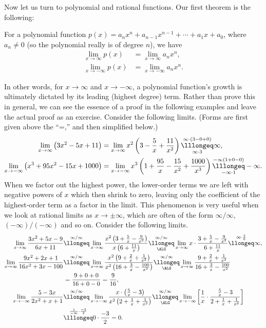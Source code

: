 Now let us turn to polynomial and rational functions.
Our first theorem is the following:
\begin{theorem}For a polynomial function
$p(x)=a_nx^n+a_{n-1}x^{n-1}+\cdots+a_1x+a_0$,
where $a_n\ne0$ (so the polynomial really is of
degree $n$), we have
\begin{align}
\lim_{x\to\infty}p(x)&=\lim_{x\to\infty}a_nx^n,\\
\lim_{x\to-\infty}p(x)&=\lim_{x\to-\infty}a_nx^n.
\end{align}\label{TheoremOnPolynomialGrowth}
\end{theorem}
In other words, for $x\to\infty$ and $x\to-\infty$,
a polynomial function's growth is ultimately
dictated by its leading (highest degree) term.  Rather than prove this
in general, we can see the essence of a proof
in the following examples and leave the actual proof
as an exercise.
\bex Consider the following limits. (Forms are first given above
the ``=,'' and then simplified below.)
\begin{align*}
\lim_{x\to\infty}\left(3x^2-5x+11\right)
&=\lim_{x\to\infty}x^2\left(3-\frac5x+\frac{11}{x^2}\right)
\overset{\infty\cdot(3-0+0)}{\underset{\infty\cdot3}{\lllongeq}}\infty,\\
\lim_{x\to-\infty}\left(x^3+95x^2-15x+1000\right)
&=\lim_{x\to-\infty}x^3\left(1+\frac{95}{x}-\frac{15}{x^2}
     +\frac{1000}{x^3}\right)
\overset{-\infty(1+0-0)}{\underset{-\infty\cdot1}{\lllongeq}}-\infty.
\end{align*}
\label{ExForHwLimitsXToInfinity}\eex
When we factor out the highest power, the lower-order
terms we are left with negative powers of $x$ which
then shrink to zero, leaving only the coefficient
of the highest-order term as a factor in the limit.
This phenomenon is very useful when we look at rational limits
as $x\to\pm\infty$, which are often of the form
$\infty/\infty$, $(-\infty)/(-\infty)$ and so on.
\bex Consider the following limits.
\begin{align*}
\lim_{x\to\infty}\frac{3x^2+5x-9}{6x+11}
  &\overset{\infty/\infty}{\llongeq}
  \lim_{x\to\infty}\frac{x^2\left(3+\frac5x-\frac9{x^2}\right)}
  {x\left(6+\frac{11}x\right)}
  \underset{\ALG}{\overset{\infty/\infty}{\llongeq}}\lim_{x\to\infty}
  x\cdot\frac{3+\frac5x-\frac9{x^2}}{6+\frac{11}{x}}
  \overset{\infty\cdot\frac36}{\llongeq}\infty,\\
\lim_{x\to\infty}\frac{9x^2+2x+1}{16x^2+3x-100}
  &\overset{\infty/\infty}{\llongeq}
  \lim_{x\to\infty}\frac{x^2\left(9+\frac2x+\frac1{x^2}\right)}
  {x^2\left(16+\frac3x-\frac{100}{x^2}\right)}
  \underset{\ALG}{\overset{\infty/\infty}{\llongeq}}\lim_{x\to\infty}
  \frac{9+\frac2x+\frac1{x^2}}{16+\frac3x-\frac{100}{x^2}}
  \\&=\frac{9+0+0}{16+0-0}=\frac9{16},\\
\lim_{x\to-\infty}\frac{5-3x}{2x^2+x+1}
  &\overset{\infty/\infty}{\llongeq}
  \lim_{x\to-\infty}\frac{x\cdot\left(\frac5x-3\right)}
  {x^2\left(2+\frac1x+\frac1{x^2}\right)}
  \underset{\ALG}{\overset{\infty/\infty}{\llongeq}}
  \lim_{x\to-\infty}\left[
    \frac1x\cdot\frac{\frac5x-3}{2+\frac1x+\frac1{x^2}}\right]\\
  &\overset{\frac1{-\infty}\cdot\frac{-3}2}{\lllongeq}0\cdot\frac{-3}2=0.
  \end{align*}
